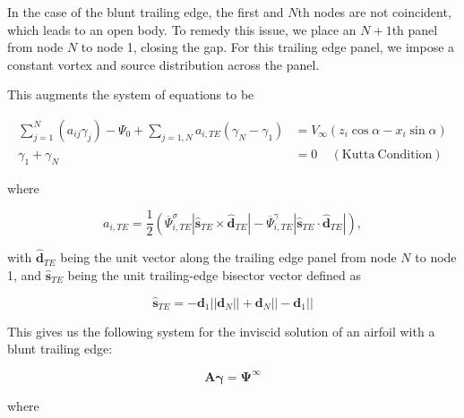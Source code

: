 \documentclass[]{article}
\newcommand{\vect}{\mathbf}
\begin{document}
In the case of the blunt trailing edge, the first and \(N\)th nodes are not coincident, which leads to an open body.  To remedy this issue, we place an \(N+1\)th panel from node \(N\) to node 1, closing the gap.  For this trailing edge panel, we impose a constant vortex and source distribution across the panel.

This augments the system of equations to be

\begin{equation}
	\begin{aligned}
		\sum_{j=1}^N(a_{ij}\gamma_j) - \Psi_0 + \sum_{j=1,N} a_{i,TE}(\gamma_N -\gamma_{1}) &= V_\infty(z_i\cos\alpha - x_i\sin\alpha) \\
		\gamma_1 + \gamma_N &= 0 ~~~~~\mathrm{(Kutta~Condition)}
	\end{aligned}
\end{equation}

\noindent where 

\begin{equation}
	a_{i,TE} = \frac{1}{2} \left( \overline{\Psi}^\sigma_{i,TE} | \vect{\hat{s}}_{TE} \times \vect{\hat{d}}_{TE}| -  \overline{\Psi}^\gamma_{i,TE} | \vect{\hat{s}}_{TE} \cdot  \vect{\hat{d}}_{TE} |\right),
\end{equation}

\noindent with \(\vect{\hat{d}}_{TE}\) being the unit vector along the trailing edge panel from node \(N\) to node 1, 
and \(\vect{\hat{s}}_{TE}\) being the unit trailing-edge bisector vector defined as

\begin{equation}
	\vect{\hat{s}}_{TE} = -\vect{d}_{1} ||\vect{d}_N|| + \vect{d}_N ||-\vect{d}_{1}||
\end{equation}


This gives us the following system for the inviscid solution of an airfoil with a blunt trailing edge:

\begin{equation}
	\vect{A}\vect{\gamma} = \vect{\Psi}^\infty
\end{equation}

\noindent where
\end{document}
